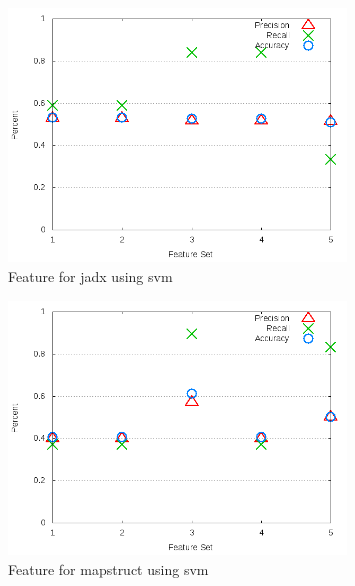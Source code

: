 \begin{figure}[!t]
\centering
\includegraphics[width=0.8\textwidth]{images/svm/test_3/jadx_sample_range.png}
\caption{Feature for jadx using \gls{svm}}
\label{fig:test_3_jadx_svm}
\end{figure}

\begin{figure}[!t]
\centering
\includegraphics[width=0.8\textwidth]{images/svm/test_3/mapstruct_sample_range.png}
\caption{Feature for mapstruct using \gls{svm}}
\label{fig:test_3_mapstruct_svm}
\end{figure}

